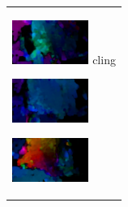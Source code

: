 \begin{figure}[htbp]
\begin{tabular}{l}
\begin{minipage}{0.165\hsize}
\begin{center}
          \hspace{0.0cm} { }
        \end{center}
      \end{minipage}
      \begin{minipage}{0.165\hsize}
        \begin{center}
          \includegraphics[clip, width=2.5cm]{./Figures/optic_sniffcling3.eps}
          \hspace{0.0cm} {cling}
        \end{center}
      \end{minipage}
      \begin{minipage}{0.165\hsize}
        \begin{center}
          \includegraphics[clip, width=2.5cm]{./Figures/optic_sniffcling4.eps}
          \hspace{0.1cm} { }
        \end{center}
      \end{minipage}
      \begin{minipage}{0.165\hsize}
        \begin{center}
          \includegraphics[clip, width=2.5cm]{./Figures/optic_sniffcling5.eps}
          \hspace{2.2cm} { }
        \end{center}
      \end{minipage}
\\ %


\end{tabular}
\end{figure}
